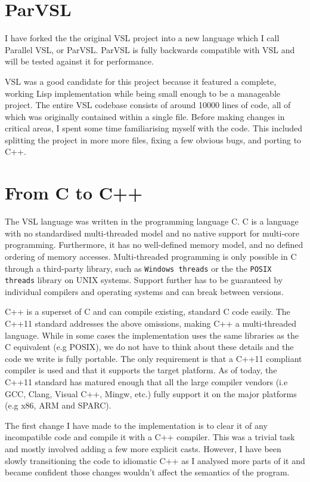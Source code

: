 \section{ParVSL}
I have forked the the original VSL project into a new language which I call Parallel VSL, or ParVSL.
ParVSL is fully backwards compatible with VSL and will be tested against it for performance.

VSL was a good candidate for this project because it featured a complete, working Lisp implementation while being
small enough to be a manageable project. The entire VSL codebase consists of around 10000 lines of code, all of which
was originally contained within a single file. Before making changes in critical areas, I spent some time familiarising
myself with the code. This included splitting the project in more more files, fixing a few obvious bugs, and porting
to C++.

\section{From C to C++}
The VSL language was written in the programming language C. C is a language with no standardised
multi-threaded model and no native support for multi-core programming. Furthermore, it has no well-defined
memory model, and no defined ordering of memory accesses. Multi-threaded programming
is only possible in C through a third-party library, such as \texttt{Windows threads} or the
the \texttt{POSIX threads} library on UNIX systems. Support further has to be guaranteed by individual compilers
and operating systems and can break between versions.

C++ is a superset of C and can compile existing, standard C code easily. The C++11 standard addresses the
above omissions, making C++ a multi-threaded language. While in some cases the implementation uses the same
libraries as the C equivalent (e.g POSIX), we do not have to think about these details and the code
we write is fully portable. The only requirement is that a C++11 compliant compiler is used and that it supports
the target platform. As of today, the C++11 standard has matured enough
that all the large compiler vendors (i.e GCC, Clang, Visual C++, Mingw, etc.) fully support it on the
major platforms (e.g x86, ARM and SPARC).

The first change I have made to the implementation is to clear it of any incompatible code and compile it
with a C++ compiler. This was a trivial task and mostly involved adding a few more explicit casts.
However, I have been slowly transitioning the code to idiomatic C++ as I analysed more parts of it
and became confident those changes wouldn't affect the semantics of the program.

